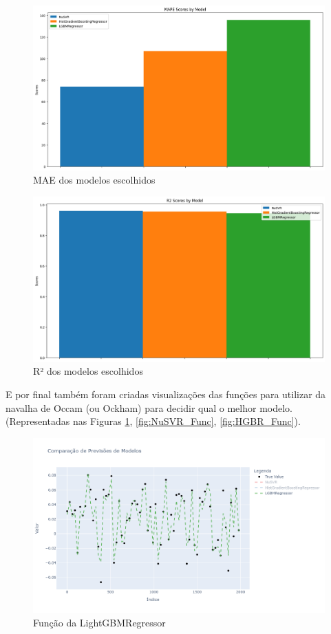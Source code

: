 \documentclass[journal]{IEEEtran}
\begin{document}
\begin{figure}[H]
    \centering
    \includegraphics[width=1\linewidth]{10.png}
    \caption{MAE dos modelos escolhidos}
\end{figure}
\begin{figure}[H]
    \centering
    \includegraphics[width=1\linewidth]{12.png}
    \caption{R² dos modelos escolhidos}
\end{figure}

E por final também foram criadas visualizações das funções para utilizar da navalha de Occam (ou Ockham) para decidir qual o melhor modelo. (Representadas nas Figuras \ref{fig:LGBM_Func}, \ref{fig:NuSVR_Func}, \ref{fig:HGBR_Func}).

\begin{figure}[H]
    \centering
    \includegraphics[width=1\linewidth]{LGBMRegressor_func.png}
    \caption{Função da LightGBMRegressor}
    \label{fig:LGBM_Func}
\end{figure}
\end{document}

